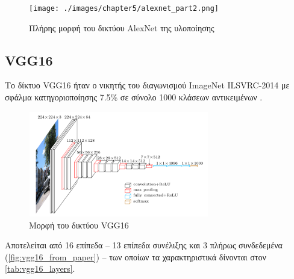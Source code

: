 \begin{figure}[H]
  \centering
  \texttt{[image: ./images/chapter5/alexnet\_part2.png]}
  \caption[Πλήρης μορφή του δικτύου AlexNet της υλοποίησης]{Πλήρης μορφή του δικτύου AlexNet της υλοποίησης}
  \label{fig:alexnet_2}
\end{figure}


\subsection{VGG16}

Το δίκτυο VGG16 ήταν ο νικητής του διαγωνισμού ImageNet ILSVRC-2014 με σφάλμα
κατηγοριοποίησης 7.5\% σε σύνολο 1000 κλάσεων αντικειμένων \cite{Simonyan14c}.

\begin{figure}[!ht]
  \centering
  \includegraphics[width=0.7\textwidth]{./images/chapter5/vgg16_from_paper.png}
  \caption[Mορφή του δικτύου VGG16]{Μορφή του δικτύου VGG16}
  \label{fig:vgg16_from_paper}
\end{figure}

Αποτελείται από 16 επίπεδα – 13 επίπεδα συνέλιξης και 3 πλήρως συνδεδεμένα (\autoref{fig:vgg16_from_paper}) – των
οποίων τα χαρακτηριστικά δίνονται στον \autoref{tab:vgg16_layers}.

